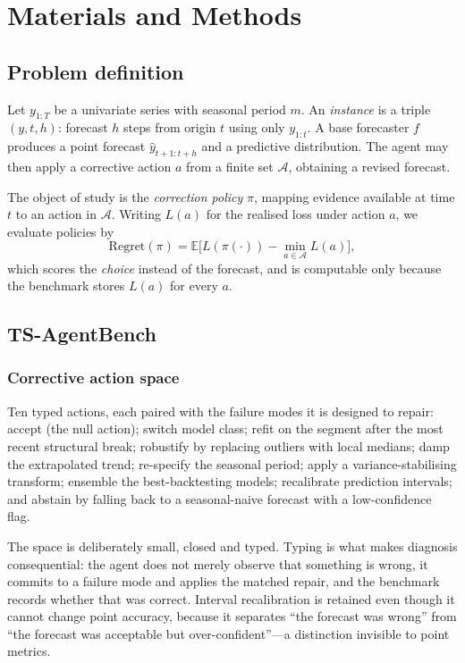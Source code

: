 \section{Materials and Methods}
\label{sec:methods}

\subsection{Problem definition}

Let $y_{1:T}$ be a univariate series with seasonal period $m$. An \emph{instance} is a
triple $(y, t, h)$: forecast $h$ steps from origin $t$ using only $y_{1:t}$. A base
forecaster $f$ produces a point forecast $\hat{y}_{t+1:t+h}$ and a predictive
distribution. The agent may then apply a corrective action $a$ from a finite set
$\mathcal{A}$, obtaining a revised forecast.

The object of study is the \emph{correction policy} $\pi$, mapping evidence available at
time $t$ to an action in $\mathcal{A}$. Writing $L(a)$ for the realised loss under
action $a$, we evaluate policies by
\begin{equation}
  \mathrm{Regret}(\pi) = \mathbb{E}\big[L(\pi(\cdot)) - \min_{a \in \mathcal{A}} L(a)\big],
\end{equation}
which scores the \emph{choice} instead of the forecast, and is computable only because
the benchmark stores $L(a)$ for every $a$.

\subsection{TS-AgentBench}

\subsubsection{Corrective action space}
\label{sec:actionspace}

Ten typed actions, each paired with the failure modes it is designed to repair:
accept (the null action); switch model class; refit on the segment after the most recent
structural break; robustify by replacing outliers with local medians; damp the
extrapolated trend; re-specify the seasonal period; apply a variance-stabilising
transform; ensemble the best-backtesting models; recalibrate prediction intervals; and
abstain by falling back to a seasonal-naive forecast with a low-confidence flag.

The space is deliberately small, closed and typed. Typing is what makes diagnosis
consequential: the agent does not merely observe that something is wrong, it commits to
a failure mode and applies the matched repair, and the benchmark records whether that
was correct. Interval recalibration is retained even though it cannot change point
accuracy, because it separates ``the forecast was wrong'' from ``the forecast was
acceptable but over-confident''---a distinction invisible to point metrics.

